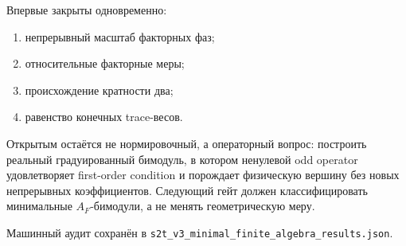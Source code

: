 Впервые закрыты одновременно:
\begin{enumerate}
 \item непрерывный масштаб факторных фаз;
 \item относительные факторные меры;
 \item происхождение кратности два;
 \item равенство конечных trace-весов.
\end{enumerate}
Открытым остаётся не нормировочный, а операторный вопрос: построить
реальный градуированный бимодуль, в котором ненулевой odd operator
удовлетворяет first-order condition и порождает физическую вершину без
новых непрерывных коэффициентов. Следующий гейт должен классифицировать
минимальные \(A_F\)-бимодули, а не менять геометрическую меру.

Машинный аудит сохранён в
\texttt{s2t\_v3\_minimal\_finite\_algebra\_results.json}.